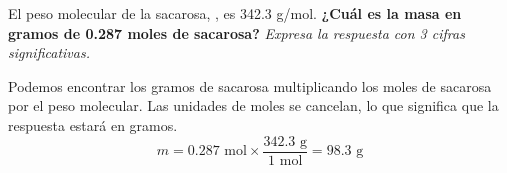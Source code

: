 El peso molecular de la sacarosa, , es 342.3 g/mol.
\textbf{¿Cuál es la masa en gramos de 0.287 moles de sacarosa?}
\emph{Expresa la respuesta con 3 cifras significativas.}

\begin{solutionbox}{3cm}
    Podemos encontrar los gramos de sacarosa multiplicando los moles de sacarosa por el peso molecular. Las unidades de moles se cancelan, lo que significa que la respuesta estará en gramos.
    \[ m =  0.287 \text{ mol} \times \frac{342.3 \text{ g}}{1 \text{ mol}} = 98.3 \text{ g} \]
\end{solutionbox}